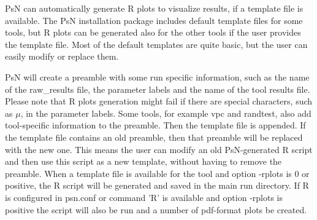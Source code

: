 
PsN can automatically generate R plots to visualize results, 
if a template file is available.
The PsN installation package includes default template files for some
tools, but R plots can be generated also for the other tools
if the user provides the template file.
Most of the default templates are quite basic, but 
the user can easily modify or replace them.

PsN will create a preamble with some run specific information, 
such as the name of the raw\_results file, the parameter labels and the name of
the tool results file. Please note that R plots generation might fail if there are special characters,
such as $\mu$, in the parameter labels.
Some tools, for example vpc and randtest, also add
tool-specific information to the preamble. 
Then the template file is appended.
If the template file contains an old preamble, then that preamble will be replaced with 
the new one. This means
the user can modify an old PsN-generated R script and then use this script as a new template,
without having to remove the preamble.
When a template file is available for the tool and option \mbox{-rplots} is 0 or positive, 
the R script will be generated and saved in the main
run directory. 
If R is configured in psn.conf or command 'R' is available and option -rplots is positive 
the script will also be run and a number of pdf-format plots be created.

\rplotsconditions

